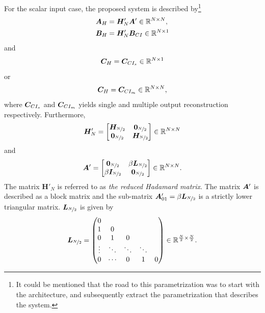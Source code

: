 For the scalar input case, the proposed system is described by\footnote{It could be mentioned that the road to this parametrization was to start with the architecture, and subsequently extract the parametrization that describes the system.}
\begin{align}
    \bm{A}_H & = \bm{H}'_N \bm{A}' \label{eq:AH_def} \in \mathbb{R}^{N \times N}, \\
    \bm{B}_H & = \bm{H}'_N \bm{B}_{CI} \label{eq:BH_def} \in \mathbb{R}^{N \times 1}
\end{align}
and
\begin{equation}
    \label{eq:CHs_def}
    \bm{C}_H = \bm{C}_{CI_s} \in \mathbb{R}^{N \times 1}
\end{equation}
or
\begin{equation}
    \label{eq:CHm_def}
    \bm{C}_H = \bm{C}_{CI_m} \in \mathbb{R}^{N \times N},
\end{equation}
where $\bm{C}_{CI_s}$ and $\bm{C}_{CI_m}$ yields single and multiple output reconstruction respectively.
Furthermore,
\begin{equation}
    \label{eq:defn_}
    \bm{H}'_N =
    \begin{bmatrix}
        \bm{H_}{\nicefrac{N}{2}} & \bm{0}_{\nicefrac{N}{2}} \\
        \bm{0}_{\nicefrac{N}{2}} & \bm{H_}{\nicefrac{N}{2}}
    \end{bmatrix} \in \mathbb{R}^{N \times N}
\end{equation}
and
\begin{equation}
    \label{eq:def_AH_}
    \bm{A}' =
    \begin{bmatrix}
        \bm{0}_{\nicefrac{N}{2}} & \beta \bm{L}_{\nicefrac{N}{2}} \\
        \beta \bm{I}_{\nicefrac{N}{2}} & \bm{0}_{\nicefrac{N}{2}}
    \end{bmatrix} \in \mathbb{R}^{N \times N}.
\end{equation}
The matrix $\bm{H}'_N$ is referred to as \textit{the reduced Hadamard matrix}. The matrix $\bm{A}'$ is described as a block matrix and the sub-matrix $\bm{A}'_{01} = \beta \bm{L}_{\nicefrac{N}{2}}$ is a strictly lower triangular matrix. $\bm{L}_{\nicefrac{N}{2}}$ is given by
\begin{equation}
    \label{eq:def_Lmat}
    \bm{L}_{\nicefrac{N}{2}} =
    \begin{pmatrix}
        0 \\
        1 & 0 & \\
        0 & 1 & 0 \\
        \vdots & \ddots & \ddots & \ddots \\
        0 & \cdots & 0 & 1 & 0
    \end{pmatrix}
    \in \mathbb{R}^{\frac{N}{2} \times \frac{N}{2}}.
\end{equation}


